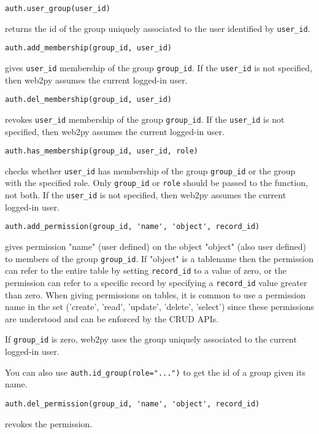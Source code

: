 \documentclass[justified,sixbynine,notoc]{tufte-book}
\def\ft{\small\tt}
\def\inxx#1{\index{#1}}
\begin{document}
\begin{fullwidth}
\begin{lstlisting}
auth.user_group(user_id)
\end{lstlisting}
\noindent returns the id of the group uniquely associated to the user identified by {\ft user\_id}.

\begin{lstlisting}
auth.add_membership(group_id, user_id)
\end{lstlisting}
\noindent gives {\ft user\_id} membership of the group {\ft group\_id}.
If the {\ft user\_id} is not specified, then web2py assumes the current logged-in user.

\begin{lstlisting}
auth.del_membership(group_id, user_id)
\end{lstlisting}
\noindent revokes {\ft user\_id} membership of the group {\ft group\_id}.
If the {\ft user\_id} is not specified, then web2py assumes the current logged-in user.

\begin{lstlisting}
auth.has_membership(group_id, user_id, role)
\end{lstlisting}
\noindent checks whether {\ft user\_id} has membership of the group {\ft group\_id} or the group with the specified role. Only {\ft group\_id} or {\ft role} should be passed to the function, not both. If the {\ft user\_id} is not specified, then web2py assumes the current logged-in user.

\begin{lstlisting}
auth.add_permission(group_id, 'name', 'object', record_id)
\end{lstlisting}
\noindent gives permission "name" (user defined) on the object "object" (also user defined) to members of the group {\ft group\_id}. If "object" is a tablename then the permission can refer to the entire table by setting {\ft record\_id} to a value of zero, or the permission can refer to a specific record by specifying a {\ft record\_id} value greater than zero. When giving permissions on tables, it is common to use a permission name in the set ('create', 'read', 'update', 'delete', 'select') since these permissions are understood and can be enforced by the CRUD APIs.

If {\ft group\_id} is zero, web2py uses the group uniquely associated to the current logged-in user.

You can also use {\ft auth.id\_group(role="...")} to get the id of a group given its name. \inxx{id\_group}

\begin{lstlisting}
auth.del_permission(group_id, 'name', 'object', record_id)
\end{lstlisting}
\noindent revokes the permission.


\end{fullwidth}
\end{document}
